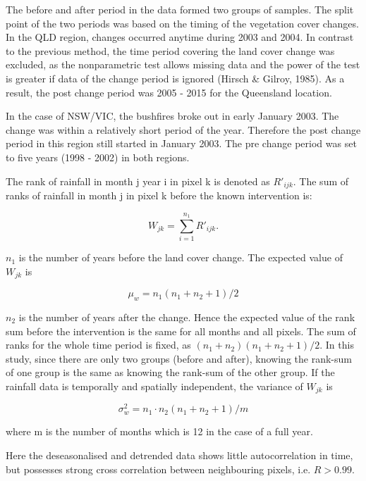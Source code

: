 \documentclass[fleqn,10pt,lineno]{wlpeerj} %
\theoremstyle{definition}
\theoremstyle{definition}
\theoremstyle{definition}
\theoremstyle{remark}
\begin{document}
The before and after period in the data formed two groups of samples.
The split point of the two periods was based on the timing of the
vegetation cover changes. In the QLD region, changes occurred anytime
during 2003 and 2004. In contrast to the previous method, the time
period covering the land cover change was excluded, as the nonparametric
test allows missing data and the power of the test is greater if data of
the change period is ignored (Hirsch \& Gilroy, 1985). As a result, the
post change period was 2005 - 2015 for the Queensland location.

In the case of NSW/VIC, the bushfires broke out in early January 2003.
The change was within a relatively short period of the year. Therefore
the post change period in this region still started in January 2003. The
pre change period was set to five years (1998 - 2002) in both regions.

The rank of rainfall in month j year i in pixel k is denoted as
\(R'_{ijk}\). The sum of ranks of rainfall in month j in pixel k before
the known intervention is:

\begin{equation}
  W_{jk} = \sum_{i=1}^{n_1}R'_{ijk}.
  \label{eq:Wj}
\end{equation}

\(n_1\) is the number of years before the land cover change. The
expected value of \(W_{jk}\) is

\begin{equation}
  \mu_w=n_1(n_1+n_2+1)/2
\end{equation}

\(n_2\) is the number of years after the change. Hence the expected
value of the rank sum before the intervention is the same for all months
and all pixels. The sum of ranks for the whole time period is fixed, as
\((n_1+n_2)(n_1+n_2+1)/2\). In this study, since there are only two
groups (before and after), knowing the rank-sum of one group is the same
as knowing the rank-sum of the other group. If the rainfall data is
temporally and spatially independent, the variance of \(W_{jk}\) is

\begin{equation}
  \sigma^2_w = n_1\cdot n_2(n_1+n_2+1)/m
\end{equation}

where m is the number of months which is 12 in the case of a full year.

Here the deseasonalised and detrended data shows little autocorrelation
in time, but possesses strong cross correlation between neighbouring
pixels, i.e. \(R>0.99\).
\end{document}
